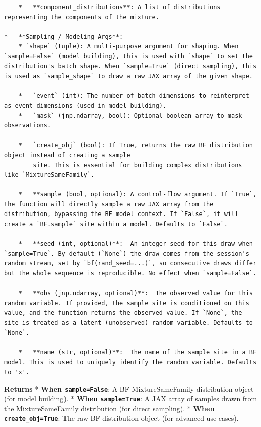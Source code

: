\documentclass[
  letterpaper,
  DIV=11,
  numbers=noendperiod]{scrartcl}
\begin{document}
\begin{verbatim}
    *   **component_distributions**: A list of distributions representing the components of the mixture.

*   **Sampling / Modeling Args**:
    * `shape` (tuple): A multi-purpose argument for shaping. When `sample=False` (model building), this is used with `shape` to set the distribution's batch shape. When `sample=True` (direct sampling), this is used as `sample_shape` to draw a raw JAX array of the given shape.

    *   `event` (int): The number of batch dimensions to reinterpret as event dimensions (used in model building).
    *   `mask` (jnp.ndarray, bool): Optional boolean array to mask observations.

    *   `create_obj` (bool): If True, returns the raw BF distribution object instead of creating a sample
        site. This is essential for building complex distributions like `MixtureSameFamily`.

    *   **sample (bool, optional): A control-flow argument. If `True`, the function will directly sample a raw JAX array from the distribution, bypassing the BF model context. If `False`, it will create a `BF.sample` site within a model. Defaults to `False`.

    *   **seed (int, optional)**:  An integer seed for this draw when `sample=True`. By default (`None`) the draw comes from the session's random stream, set by `bf(rand_seed=...)`, so consecutive draws differ but the whole sequence is reproducible. No effect when `sample=False`.

    *   **obs (jnp.ndarray, optional)**:  The observed value for this random variable. If provided, the sample site is conditioned on this value, and the function returns the observed value. If `None`, the site is treated as a latent (unobserved) random variable. Defaults to `None`.

    *   **name (str, optional)**:  The name of the sample site in a BF model. This is used to uniquely identify the random variable. Defaults to 'x'.
\end{verbatim}

\textbf{Returns} * \textbf{When \texttt{sample=False}}: A BF
MixtureSameFamily distribution object (for model building). *
\textbf{When \texttt{sample=True}}: A JAX array of samples drawn from
the MixtureSameFamily distribution (for direct sampling). * \textbf{When
\texttt{create\_obj=True}}: The raw BF distribution object (for advanced
use cases).
\end{document}

